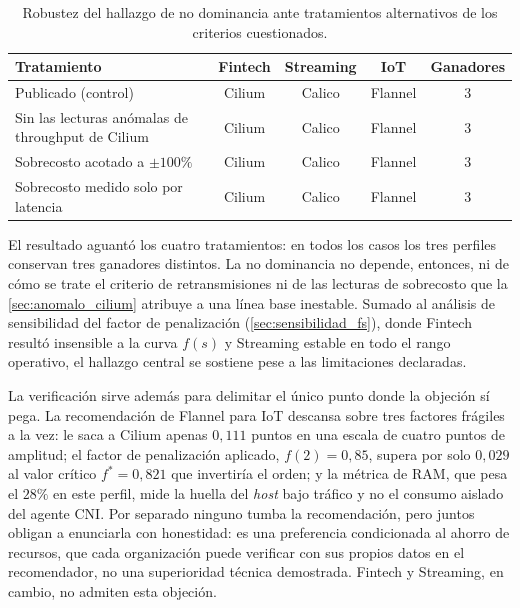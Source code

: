 \begin{table}[htbp]
\centering
\small
\caption{Robustez del hallazgo de no dominancia ante tratamientos alternativos de los criterios cuestionados.}
\label{tab:robustez_mcda}
\begin{tabularx}{\textwidth}{|Y|c|c|c|c|}
\hline
\textbf{Tratamiento} & \textbf{Fintech} & \textbf{Streaming} & \textbf{IoT} & \textbf{Ganadores} \\
\hline
Publicado (control) & Cilium & Calico & Flannel & 3 \\
\hline
Sin las lecturas anómalas de throughput de Cilium & Cilium & Calico & Flannel & 3 \\
\hline
Sobrecosto acotado a $\pm100\%$ & Cilium & Calico & Flannel & 3 \\
\hline
Sobrecosto medido solo por latencia & Cilium & Calico & Flannel & 3 \\
\hline
\end{tabularx}
\end{table}

El resultado aguantó los cuatro tratamientos: en todos los casos los tres perfiles conservan tres ganadores distintos. La no dominancia no depende, entonces, ni de cómo se trate el criterio de retransmisiones ni de las lecturas de sobrecosto que la \cref{sec:anomalo_cilium} atribuye a una línea base inestable. Sumado al análisis de sensibilidad del factor de penalización (\cref{sec:sensibilidad_fs}), donde Fintech resultó insensible a la curva $f(s)$ y Streaming estable en todo el rango operativo, el hallazgo central se sostiene pese a las limitaciones declaradas.

La verificación sirve además para delimitar el único punto donde la objeción sí pega. La recomendación de Flannel para IoT descansa sobre tres factores frágiles a la vez: le saca a Cilium apenas $0{,}111$ puntos en una escala de cuatro puntos de amplitud; el factor de penalización aplicado, $f(2)=0{,}85$, supera por solo $0{,}029$ al valor crítico $f^{*}=0{,}821$ que invertiría el orden; y la métrica de RAM, que pesa el $28\%$ en este perfil, mide la huella del \emph{host} bajo tráfico y no el consumo aislado del agente CNI. Por separado ninguno tumba la recomendación, pero juntos obligan a enunciarla con honestidad: es una preferencia condicionada al ahorro de recursos, que cada organización puede verificar con sus propios datos en el recomendador, no una superioridad técnica demostrada. Fintech y Streaming, en cambio, no admiten esta objeción.

